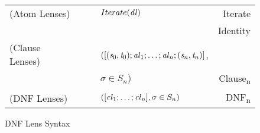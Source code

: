 \begin{figure} \begin{tabular}{l@{\ }l@{\ }c@{\ }l@{\ }r}

(Atom Lenses) &\AtomLens{} & \GEq{} & $Iterate(\mathit{dl})$ & Iterate\\
& & & \GBar{} \IdentityLens{} & Identity\\
(Clause Lenses) &\ClauseLens{} & \GEq{} &
$([(\mathit{s}_0,\mathit{t}_0);\mathit{al}_1;\ldots;\mathit{al}_n;(\mathit{s}_n,\mathit{t}_n)]$, &\\
& & & $\sigma \in S_n)$ & Clause\textsubscript{n}\\
(DNF Lenses)& \DNFLens{} & \GEq{} & $([\mathit{cl}_1;\ldots;\mathit{cl}_n], \sigma \in S_n)$ & DNF\textsubscript{n}\\
\end{tabular}
\caption{DNF Lens Syntax}
\label{fig:dnf-lens-syntax}
\end{figure}
